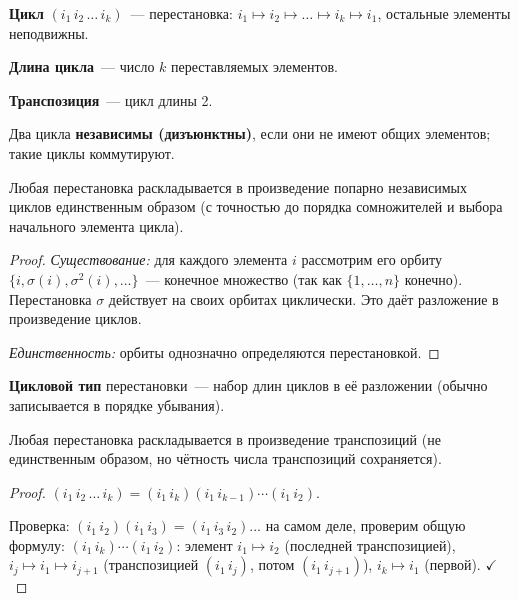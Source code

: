 \documentclass[12pt]{article}
\begin{document}
	\begin{definition}
		\textbf{Цикл} $(i_1 \, i_2 \, \dots \, i_k)$~--- перестановка: $i_1 \mapsto i_2 \mapsto \dots \mapsto i_k \mapsto i_1$, остальные элементы неподвижны.
		
		\textbf{Длина цикла}~--- число $k$ переставляемых элементов.
		
		\textbf{Транспозиция}~--- цикл длины 2.
		
		Два цикла \textbf{независимы (дизъюнктны)}, если они не имеют общих элементов; такие циклы коммутируют.
	\end{definition}
	
	\begin{theorem}
		Любая перестановка раскладывается в произведение попарно независимых циклов единственным образом (с точностью до порядка сомножителей и выбора начального элемента цикла).
	\end{theorem}
	
	\begin{proof}
		\textit{Существование:} для каждого элемента $i$ рассмотрим его орбиту $\{i, \sigma(i), \sigma^2(i), \dots\}$~--- конечное множество (так как $\{1, \dots, n\}$ конечно). Перестановка $\sigma$ действует на своих орбитах циклически. Это даёт разложение в произведение циклов.
		
		\textit{Единственность:} орбиты однозначно определяются перестановкой.
	\end{proof}
	
	\begin{definition}
		\textbf{Цикловой тип} перестановки~--- набор длин циклов в её разложении (обычно записывается в порядке убывания).
	\end{definition}
	
	\begin{theorem}
		Любая перестановка раскладывается в произведение транспозиций (не единственным образом, но чётность числа транспозиций сохраняется).
	\end{theorem}
	
	\begin{proof}
		$(i_1 \, i_2 \, \dots \, i_k) = (i_1 \, i_k)(i_1 \, i_{k-1}) \cdots (i_1 \, i_2)$.
		
		Проверка: $(i_1 \, i_2)(i_1 \, i_3) = (i_1 \, i_3 \, i_2)$... на самом деле, проверим общую формулу:
		$(i_1 \, i_k)\cdots(i_1 \, i_2)$: элемент $i_1 \mapsto i_2$ (последней транспозицией), $i_j \mapsto i_1 \mapsto i_{j+1}$ (транспозицией $(i_1 \, i_j)$, потом $(i_1 \, i_{j+1})$), $i_k \mapsto i_1$ (первой). $\checkmark$
	\end{proof}
	
\end{document}
